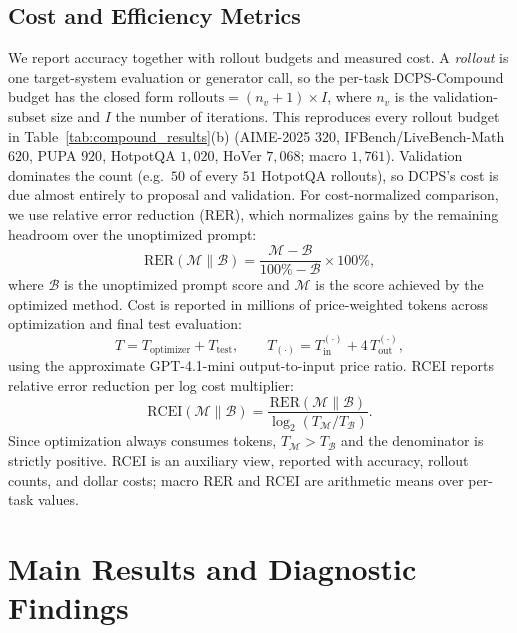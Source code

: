 \documentclass[runningheads]{llncs}
\begin{document}
\subsection{Cost and Efficiency Metrics}
\label{sec:rcei}
We report accuracy together with rollout budgets and measured cost. A \emph{rollout} is one target-system evaluation or generator call, so the per-task DCPS-Compound budget has the closed form $\mathrm{rollouts}=(n_v+1)\times I$, where $n_v$ is the validation-subset size and $I$ the number of iterations. This reproduces every rollout budget in Table~\ref{tab:compound_results}(b) (AIME-2025 $320$, IFBench/LiveBench-Math $620$, PUPA $920$, HotpotQA $1{,}020$, HoVer $7{,}068$; macro $1{,}761$). Validation dominates the count (e.g.\ $50$ of every $51$ HotpotQA rollouts), so DCPS's cost is due almost entirely to proposal and validation. For cost-normalized comparison, we use relative error reduction (RER), which normalizes gains by the remaining headroom over the unoptimized prompt:
\begin{equation}
\mathrm{RER}(\mathcal{M}\parallel\mathcal{B}) = \frac{\mathcal{M}-\mathcal{B}}{100\%-\mathcal{B}}\times 100\%,
\end{equation}
where $\mathcal{B}$ is the unoptimized prompt score and $\mathcal{M}$ is the score achieved by the optimized method. Cost is reported in millions of price-weighted tokens across optimization and final test evaluation:
\begin{equation}
T = T_{\text{optimizer}} + T_{\text{test}}, \qquad T_{(\cdot)}=T^{(\cdot)}_{\text{in}} + 4\,T^{(\cdot)}_{\text{out}},
\end{equation}
using the approximate GPT-4.1-mini output-to-input price ratio. RCEI reports relative error reduction per log cost multiplier:
\begin{equation}
\mathrm{RCEI}(\mathcal{M}\parallel\mathcal{B}) = \frac{\mathrm{RER}(\mathcal{M}\parallel\mathcal{B})}{\log_{2}\left(T_{\mathcal{M}}/T_{\mathcal{B}}\right)}.
\end{equation}
Since optimization always consumes tokens, $T_{\mathcal{M}}>T_{\mathcal{B}}$ and the denominator is strictly positive. RCEI is an auxiliary view, reported with accuracy, rollout counts, and dollar costs; macro RER and RCEI are arithmetic means over per-task values.

\section{Main Results and Diagnostic Findings}
\label{sec:main_results_diagnostic}
\end{document}
